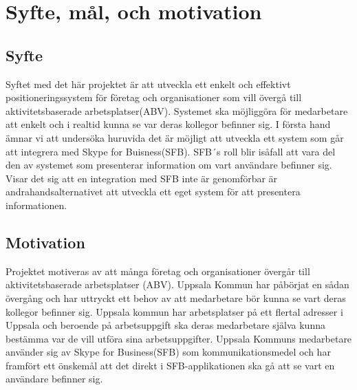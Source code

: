\documentclass[swedish, a4paper,12pt]{article}
\begin{document}


\newpage
\section{Syfte, mål, och motivation}
\subsection{Syfte}
Syftet med det här projektet är att utveckla ett enkelt och effektivt positioneringssystem för företag och organisationer som vill övergå till aktivitetsbaserade arbetsplatser(ABV). Systemet ska möjliggöra för medarbetare att enkelt och i realtid kunna se var deras kollegor befinner sig. I första hand ämnar vi att undersöka huruvida det är möjligt att utveckla ett system som går att integrera med Skype for Buisness(SFB). SFB´s roll blir isåfall att vara del den av systemet som presenterar information om vart användare befinner sig. Visar det sig att en integration med SFB inte är genomförbar är andrahandsalternativet att utveckla ett eget system för att presentera informationen.

\subsection{Motivation}

Projektet motiveras av att många företag och organisationer övergår till aktivitetsbaserade arbetsplatser (ABV). Uppsala Kommun har påbörjat en sådan övergång och har uttryckt ett behov av att medarbetare bör kunna se vart deras kollegor befinner sig. Uppsala kommun har arbetsplatser på ett flertal adresser i Uppsala och beroende på arbetsuppgift ska deras medarbetare själva kunna bestämma var de vill utföra sina arbetsuppgifter. Uppsala Kommuns medarbetare använder sig av Skype for Business(SFB) som kommunikationsmedel och har framfört ett önskemål att det direkt i SFB-applikationen ska gå att se vart en användare befinner sig.
\end{document}
